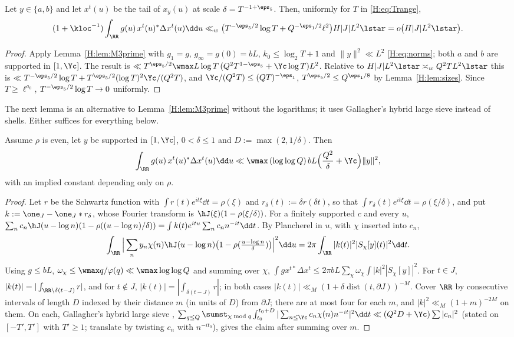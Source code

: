 \begin{corollary}\label{H:cor:tails}
Let $y\in\{a,b\}$ and let $x^t(u)$ be the tail of $x_y(u)$ at scale $\delta=T^{-1+\eps_5}$. Then, uniformly for $T$ in \eqref{H:eq:Trange},
\[
(1+\kloc^{-1})\int_\RR g(u)\,x^t(u)^*\Delta x^t(u)\dd u\ll_w\big(T^{-\eps_5/2}\log T+Q^{-\eps_1/2}\ell^2\big)H|J|L^2\lstar=o\big(H|J|L^2\lstar\big).
\]
\end{corollary}
\begin{proof}
Apply Lemma~\ref{H:lem:M3prime} with $g_1=g$, $g_\infty=g(0)=bL$, $k_0\le\log_2T+1$ and $\|y\|^2\ll L^2$ \eqref{H:eq:norms}; both $a$ and $b$ are supported in $[1,\Yc]$. The result is $\ll T^{\eps_5/2}\wmax L\log T\,(Q^2T^{1-\eps_5}+\Yc\log T)L^2$. Relative to $H|J|L^2\lstar\asymp_wQ^2TL^2\lstar$ this is $\ll T^{-\eps_5/2}\log T+T^{\eps_5/2}(\log T)^2\Yc/(Q^2T)$, and $\Yc/(Q^2T)\le(QT)^{-\eps_1}$, $T^{\eps_5/2}\le Q^{\eps_1/8}$ by Lemma~\ref{H:lem:sizes}. Since $T\ge\ell^{a_0}$, $T^{-\eps_5/2}\log T\to0$ uniformly.
\end{proof}

The next lemma is an alternative to Lemma~\ref{H:lem:M3prime} without the logarithms; it uses Gallagher's hybrid large sieve instead of shells. Either suffices for everything below.

\begin{lemma}\label{H:lem:M3G}
Assume $\rho$ is even, let $y$ be supported in $[1,\Yc]$, $0<\delta\le1$ and $D:=\max(2,1/\delta)$. Then
\[
\int_\RR g(u)\,x^t(u)^*\Delta x^t(u)\dd u\ll\wmax\,(\log\log Q)\,bL\Big(\frac{Q^2}\delta+\Yc\Big)\|y\|^2,
\]
with an implied constant depending only on $\rho$.
\end{lemma}
\begin{proof}
Let $r$ be the Schwartz function with $\int r(t)e^{it\xi}\dd t=\rho(\xi)$ and $r_\delta(t):=\delta r(\delta t)$, so that $\int r_\delta(t)e^{it\xi}\dd t=\rho(\xi/\delta)$, and put $k:=\one_J-\one_J*r_\delta$, whose Fourier transform is $\hJ(\xi)(1-\rho(\xi/\delta))$. For a finitely supported $c$ and every $u$, $\sum_nc_n\hJ(u-\log n)(1-\rho((u-\log n)/\delta))=\int k(t)e^{itu}\sum_nc_nn^{-it}\dd t$. By Plancherel in $u$, with $\chi$ inserted into $c_n$,
\[
\int_\RR\Big|\sum_ny_n\chi(n)\hJ(u-\log n)\big(1-\rho(\tfrac{u-\log n}\delta)\big)\Big|^2\dd u=2\pi\int_\RR|k(t)|^2|S_\chi[y](t)|^2\dd t .
\]
Using $g\le bL$, $\omega_\chi\le\wmax q/\varphi(q)\ll\wmax\log\log Q$ and summing over $\chi$,
$\int gx^{t*}\Delta x^t\le2\pi bL\sum_\chi\omega_\chi\int|k|^2|S_\chi[y]|^2$. For $t\in J$, $|k(t)|=|\int_{\RR\setminus\delta(t-J)}r|$, and for $t\notin J$, $|k(t)|=|\int_{\delta(t-J)}r|$; in both cases $|k(t)|\ll_M(1+\delta\operatorname{dist}(t,\partial J))^{-M}$. Cover $\RR$ by consecutive intervals of length $D$ indexed by their distance $m$ (in units of $D$) from $\partial J$; there are at most four for each $m$, and $|k|^2\ll_M(1+m)^{-2M}$ on them. On each, Gallagher's hybrid large sieve \cite[Theorem~3, (15)]{Gal70}, $\sum_{q\le Q}\sumst_{\chi\bmod q}\int_{t_0}^{t_0+D}|\sum_{n\le\Yc}c_n\chi(n)n^{-it}|^2\dd t\ll(Q^2D+\Yc)\sum|c_n|^2$ (stated on $[-T',T']$ with $T'\ge1$; translate by twisting $c_n$ with $n^{-it_0}$), gives the claim after summing over $m$.
\end{proof}

